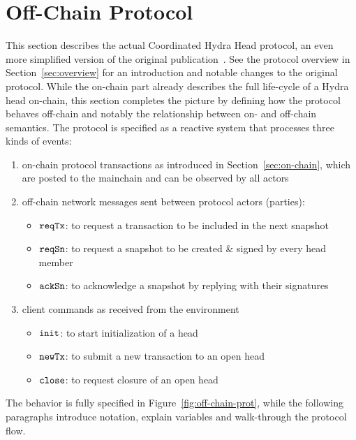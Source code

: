 \section{Off-Chain Protocol}\label{sec:offchain}

This section describes the actual Coordinated Hydra Head protocol, an even more
simplified version of the original publication~\cite{hydrahead20}. See the
protocol overview in Section~\ref{sec:overview} for an introduction and notable
changes to the original protocol. While the on-chain part already describes the
full life-cycle of a Hydra head on-chain, this section completes the picture by
defining how the protocol behaves off-chain and notably the relationship between
on- and off-chain semantics. The protocol is specified as a reactive system that
processes three kinds of events:
\begin{enumerate}
	\item on-chain protocol transactions as introduced in
	      Section~\ref{sec:on-chain}, which are posted to the mainchain and can be
	      observed by all actors
	\item off-chain network messages sent between protocol actors (parties):
	      \begin{itemize}
		      \item $\mathtt{reqTx}$: to request a transaction to be included in the next snapshot
		      \item $\mathtt{reqSn}$: to request a snapshot to be created \& signed by every head member
		      \item $\mathtt{ackSn}$: to acknowledge a snapshot by replying with their signatures
	      \end{itemize}
	\item client commands as received from the environment
	      \begin{itemize}
		      \item $\mathtt{init}$: to start initialization of a head
		      \item $\mathtt{newTx}$: to submit a new transaction to an open head
		      \item $\mathtt{close}$: to request closure of an open head
	      \end{itemize}
\end{enumerate}

The behavior is fully specified in Figure~\ref{fig:off-chain-prot}, while the
following paragraphs introduce notation, explain variables and walk-through the
protocol flow.


